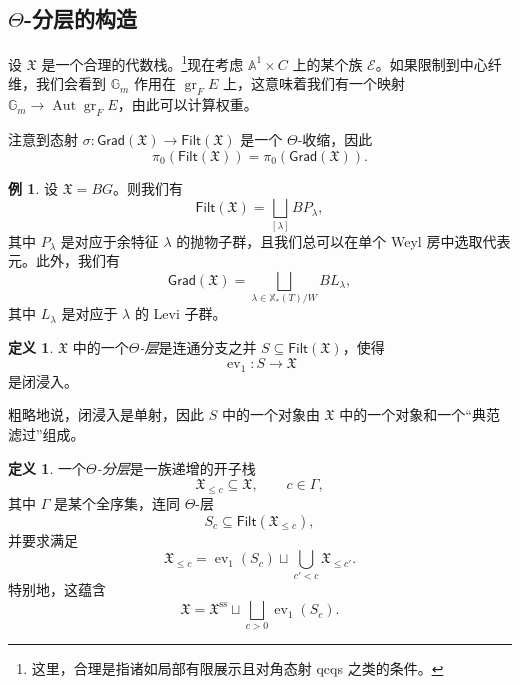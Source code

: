 \documentclass{amsart}
\theoremstyle{definition}
\newtheorem{defn}[thm]{定义}
\newtheorem{exm}[thm]{例}
\theoremstyle{remark}
\theoremstyle{plain}
\theoremstyle{definition}
\theoremstyle{remark}
\newcommand{\A}{\mathbb{A}}
\newcommand{\G}{\mathbb{G}}
\newcommand{\mc}[1]{\mathcal{#1}}
\newcommand{\mf}[1]{\mathfrak{#1}}
\newcommand{\mr}[1]{\mathrm{#1}}
\newcommand{\on}[1]{\operatorname{#1}}
\newcommand{\ms}[1]{\mathsf{#1}}
\newcommand{\1}{\mathbf{1}}
\newcommand{\2}{\mathbf{2}}
\newcommand{\3}{\mathbf{3}}
\DeclareMathOperator{\Aut}{Aut}
\DeclareMathOperator{\ev}{ev}
\begin{document}
\subsection{\(\Theta\)-分层的构造}%
\label{sub:Construction of Theta-stratifications}

设 \(\mf{X}\) 是一个合理的代数栈。\footnote{这里，合理是指诸如局部有限展示且对角态射 qcqs 之类的条件。}现在考虑 \(\A^1 \times C\) 上的某个族 \(\mc{E}\)。如果限制到中心纤维，我们会看到 \(\G_m\) 作用在 \(\on{gr}_F E\) 上，这意味着我们有一个映射 \(\G_m \to \Aut \on{gr}_F E\)，由此可以计算权重。 

注意到态射 \(\sigma \colon \ms{Grad}(\mf{X}) \to \ms{Filt}(\mf{X})\) 是一个 \(\Theta\)-收缩，因此
\[ \pi_0(\ms{Filt}(\mf{X})) = \pi_0(\ms{Grad}(\mf{X})). \]

\begin{exm}
    设 \(\mf{X} = BG\)。则我们有
    \[\ms{Filt}(\mf{X}) = \bigsqcup_{[\lambda]} B P_{\lambda}, \]
    其中 \(P_{\lambda}\) 是对应于余特征 \(\lambda\) 的抛物子群，且我们总可以在单个 Weyl 房中选取代表元。此外，我们有
    \[ \ms{Grad}(\mf{X}) = \bigsqcup_{\lambda \in \mathbb{X}_*(T)/W} B L_{\lambda}, \]
    其中 \(L_{\lambda}\) 是对应于 \(\lambda\) 的 Levi 子群。
\end{exm}

\begin{defn}
    \(\mf{X}\) 中的一个\textit{\(\Theta\)-层}是连通分支之并 \(S \subseteq \ms{Filt}(\mf{X})\)，使得
    \[ \ev_1 \colon S \to \mf{X} \]
    是闭浸入。
\end{defn}

粗略地说，闭浸入是单射，因此 \(S\) 中的一个对象由 \(\mf{X}\) 中的一个对象和一个“典范滤过”组成。

\begin{defn}
    一个\textit{\(\Theta\)-分层}是一族递增的开子栈
    \[ \mf{X}_{\leq c} \subseteq \mf{X}, \qquad c \in \Gamma, \]
    其中 \(\Gamma\) 是某个全序集，连同 \(\Theta\)-层
    \[ S_c \subseteq \ms{Filt}(\mf{X}_{\leq c}), \]
    并要求满足
    \[ \mf{X}_{\leq c} = \ev_1(S_c) \sqcup \bigcup_{c' < c} \mf{X}_{\leq c'}. \]
    特别地，这蕴含
    \[ \mf{X} = \mf{X}^{\mr{ss}} \sqcup \bigsqcup_{c > 0} \ev_1(S_c). \]
\end{defn}
\end{document}
